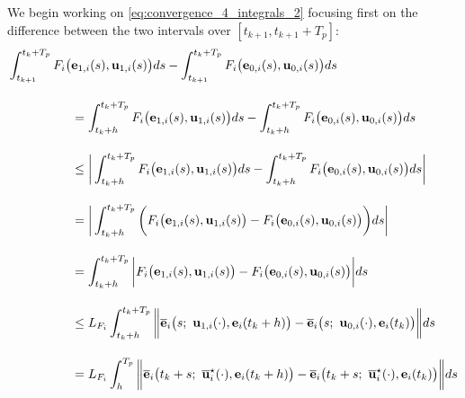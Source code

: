 We begin working on \eqref{eq:convergence_4_integrals_2} focusing
first on the difference between the two intervals over $[t_{k+1}, t_{k+1} + T_p]$:
\begin{align}
  \int_{t_{k+1}}^{t_k + T_p} F_i \big(&\vect{e}_{1,i}(s), \vect{u}_{1,i} (s)\big) d s
  - \int_{t_{k+1}}^{t_k + T_p} F_i \big(\vect{e}_{0,i}(s), \vect{u}_{0,i} (s)\big) d s \\[2.5ex]
  &= \int_{t_k+h}^{t_k + T_p} F_i \big(\vect{e}_{1,i}(s), \vect{u}_{1,i} (s)\big) d s
    - \int_{t_k+h}^{t_k + T_p} F_i \big(\vect{e}_{0,i}(s), \vect{u}_{0,i} (s)\big) d s \\[2.5ex]
  & \leq \bigg| \int_{t_k+h}^{t_k + T_p} F_i \big(\vect{e}_{1,i}(s), \vect{u}_{1,i} (s)\big) d s
    - \int_{t_k+h}^{t_k + T_p} F_i \big(\vect{e}_{0,i}(s), \vect{u}_{0,i} (s)\big) d s \bigg| \\[2.5ex]
  & = \bigg| \int_{t_k+h}^{t_k + T_p} \bigg( F_i \big(\vect{e}_{1,i}(s), \vect{u}_{1,i} (s)\big)
    -  F_i \big(\vect{e}_{0,i}(s), \vect{u}_{0,i} (s)\big) \bigg) d s \bigg| \\[2.5ex]
  & = \int_{t_k+h}^{t_k + T_p} \bigg| F_i \big(\vect{e}_{1,i}(s), \vect{u}_{1,i} (s)\big)
    -  F_i \big(\vect{e}_{0,i}(s), \vect{u}_{0,i} (s)\big) \bigg| d s \\[2.5ex]
  & \leq L_{F_i}\int_{t_k+h}^{t_k + T_p} \bigg\| \overline{\vect{e}}_i\big(s;\ \vect{u}_{1,i} (\cdot), \vect{e}_i(t_k + h) \big)
    -  \overline{\vect{e}}_i\big(s;\ \vect{u}_{0,i} (\cdot), \vect{e}_i(t_k)\big) \bigg\| d s \\[2.5ex]
    & = L_{F_i}\int_{h}^{T_p} \bigg\| \overline{\vect{e}}_i\big(t_k + s;\ \overline{\vect{u}}_i^{\star}(\cdot), \vect{e}_i(t_k + h) \big)
    -  \overline{\vect{e}}_i\big(t_k + s;\ \overline{\vect{u}}_i^{\star}(\cdot), \vect{e}_i(t_k)\big) \bigg\| d s
\label{eq:integrals_over_same_u_LV}
\end{align}


